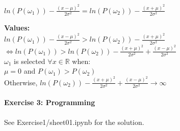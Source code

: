 \documentclass{article}
\begin{document}
\begin{description}
\begin{description}
$ln(P(\omega_1)) - \frac{(x-\mu)^2}{2\sigma^2} = ln(P(\omega_2)) - \frac{(x+\mu)^2}{2\sigma^2}$ 

\vspace{0.3cm} 

\item \textbf{Values:} \\

$ln(P(\omega_1)) - \frac{(x-\mu)^2}{2\sigma^2} > ln(P(\omega_2)) - \frac{(x+\mu)^2}{2\sigma^2}$ \\

$\Leftrightarrow ln(P(\omega_1)) > ln(P(\omega_2)) - \frac{(x+\mu)^2}{2\sigma^2} + \frac{(x-\mu)^2}{2\sigma^2}$ \\

$\omega_1$ is selected $\forall x \in \mathbb{R}$ when: \\

$\mu = 0$ and  $P(\omega_1) > P(\omega_2)$ \\

Otherwise, $ln(P(\omega_2)) - \frac{(x+\mu)^2}{2\sigma^2} + \frac{(x-\mu)^2}{2\sigma^2} \rightarrow \infty$

\end{description}

\end{description}

\paragraph{Exercise 3: Programming}

See Exercise1/sheet01.ipynb for the solution.
\end{document}
